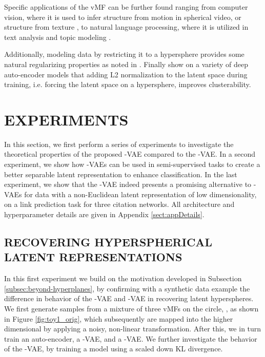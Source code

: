 \documentclass[letterpaper]{article}
\begin{document}
Specific applications of the vMF can be further found ranging from computer vision, where it is used to infer structure from motion \citep{guan2017structure} in spherical video, or structure from texture \citep{wilson2014spherical-texture}, to natural language processing, where it is utilized in text analysis \citep{banerjee2003generative-text, banerjee2005clustering} and topic modeling \citep{banerjee2007topic, reisinger:icml10}. 

Additionally, modeling data by restricting it to a hypersphere provides some natural regularizing properties as noted in \citep{liu-nips17-hypersphere-cnn}. Finally \citet{aytekin2018clustering} show on a variety of deep auto-encoder models that adding L2 normalization to the latent space during training, i.e. forcing the latent space on a hypersphere, improves clusterability.

\section{EXPERIMENTS} \label{sec:exp}

In this section, we first perform a series of experiments to investigate the theoretical properties of the proposed \Sv-VAE compared to the \Nv-VAE. In a second experiment, we show how \Sv-VAEs can be used in semi-supervised tasks to create a better separable latent representation to enhance classification. In the last experiment, we show that the \Sv-VAE indeed presents a promising alternative to \Nv-VAEs for data with a non-Euclidean latent representation of low dimensionality, on a link prediction task for three citation networks. All architecture and hyperparameter details are given in Appendix \ref{sect:appDetails}.

\subsection{RECOVERING HYPERSPHERICAL LATENT REPRESENTATIONS} \label{subsec:exp-recover-latent}

In this first experiment we build on the motivation developed in Subsection \ref{subsec:beyond-hyperplanes}, by confirming with a synthetic data example the difference in behavior of the \Nv-VAE and \Sv-VAE in recovering latent hyperspheres. We first generate samples from a mixture of three vMFs on the circle, , as shown in Figure \ref{fig:toy1_orig}, which subsequently are mapped into the higher dimensional  by applying a noisy, non-linear transformation. After this, we in turn train an auto-encoder, a \Nv-VAE, and a \Sv-VAE. We further investigate the behavior of the \Nv-VAE, by training a model using a scaled down KL divergence.
\end{document}
